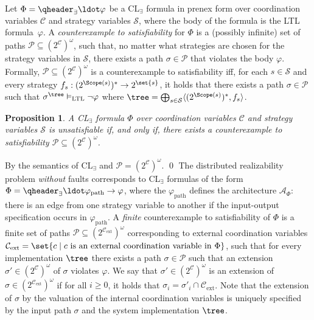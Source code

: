 \documentclass{LMCS}
\theoremstyle{plain}\newtheorem{theorem}[thm]{Theorem}
\theoremstyle{plain}\newtheorem{lemma}[thm]{Lemma}
\theoremstyle{plain}\newtheorem{proposition}[thm]{Proposition}
\theoremstyle{plain}\newtheorem{corollary}[thm]{Corollary}
\theoremstyle{definition}\newtheorem{definition}{Definition}[section]
\begin{document}
Let $\Phi=\qheader_\exists \ldot \varphi$ be a CL$_\exists$ formula in prenex form over coordination variables $\mathcal{C}$ and strategy variables $\mathcal{S}$, where the body of the formula is the LTL formula~$\varphi$.
A \emph{counterexample to satisfiability} for $\Phi$ is a (possibly infinite) set of paths $\mathcal{P} \subseteq (2^\mathcal{C})^\omega$, such that, no matter what strategies are chosen for the strategy variables in $\mathcal{S}$, there exists a path $\sigma \in \mathcal{P}$ that violates the body $\varphi$.
Formally, $\mathcal{P} \subseteq (2^\mathcal{C})^\omega$ is a counterexample to satisfiability iff, for each $s \in \mathcal{S}$ and every strategy $f_s: (2^{\Scope(s)})^* \rightarrow 2^\set{s}$, it holds that there exists a path $\sigma \in \mathcal{P}$ such that $\sigma^\tree \vDash_\text{LTL} \neg \varphi$ where $\tree = \bigoplus_{s \in \mathcal{S}} \langle (2^{\Scope(s)})^*,f_s \rangle$.
\begin{proposition} \label{eq:ecl_unsatisfiability}
A CL$_\exists$ formula $\Phi$ over coordination variables $\mathcal{C}$ and strategy variables $\mathcal{S}$
is unsatisfiable if, and only if, there exists a counterexample to satisfiability $\mathcal{P} \subseteq (2^\mathcal{C})^\omega$.
\end{proposition}
\proof
  By the semantics of CL$_\exists$ and $\mathcal{P} = (2^\mathcal{C})^\omega$.
\qed\noindent
The distributed realizability problem \emph{without} faults corresponds to CL$_\exists$ formulas of the form $\Phi = \qheader_\exists \ldot \varphi_{\text{path}} \rightarrow \varphi$, where the $\varphi_{\text{path}}$ defines the architecture $\mathcal{A}_\Phi$: there is an edge from one strategy variable to another if the input-output specification occurs in $\varphi_{\text{path}}$.
A \emph{finite} counterexample to satisfiability of $\Phi$ is a finite set of paths $\mathcal{P} \subseteq (2^{\mathcal{C}_\text{ext}})^\omega$ corresponding to external coordination variables $\mathcal{C}_\text{ext} = \set{c \mid c \text{ is an external coordination variable in } \Phi}$, such that for every implementation $\tree$ there exists a path $\sigma \in \mathcal{P}$ such that an extension $\sigma' \in (2^\mathcal{C})^\omega$ of $\sigma$ violates $\varphi$.
We say that $\sigma' \in (2^\mathcal{C})^\omega$ is an extension of $\sigma \in (2^{\mathcal{C}_\text{ext}})^\omega$ if for all $i \geq 0$, it holds that $\sigma_i = \sigma'_i \cap \mathcal{C}_\text{ext}$.
Note that the extension of $\sigma$ by the valuation of the internal coordination variables is uniquely specified by the input path $\sigma$ and the system implementation $\tree$.
\end{document}
